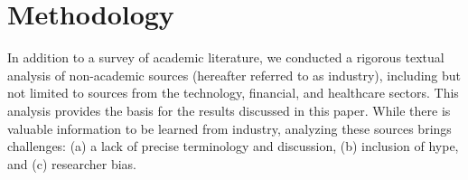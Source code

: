 
\section{Methodology}
\label{sec:method}

In addition to a survey of academic literature, we conducted a rigorous textual analysis of non-academic sources (hereafter referred to as industry),
including but not limited to sources from the technology, financial, and healthcare sectors.
This analysis provides the basis for the results discussed in this paper.
While there is valuable information to be learned from industry, analyzing 
these sources brings challenges: (a) a lack of precise terminology and 
discussion, (b) inclusion of hype, and (c) researcher bias.

